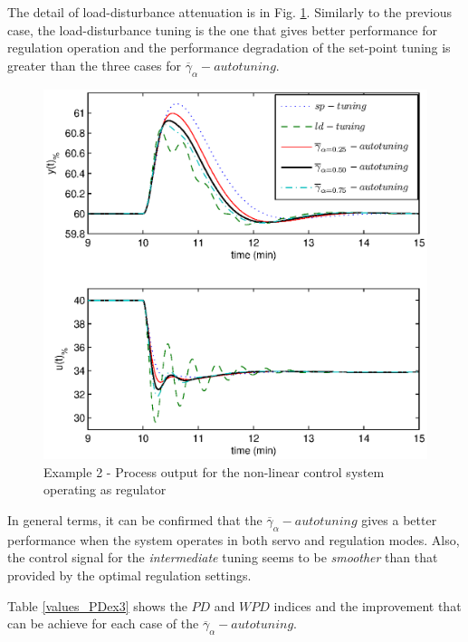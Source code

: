 The detail of load-disturbance attenuation is in Fig. \ref{y33}.
Similarly to the previous case, the load-disturbance tuning is the
one that gives better performance for regulation operation and the
performance degradation of the set-point tuning is greater than
the three cases for $\overline{\gamma}_{\alpha}-autotuning$.

\begin{figure}[htb!]
    \begin{center}
        \includegraphics[width=0.7\linewidth]{y3outp3.eps}
       \caption{Example 2 - Process output for the non-linear control system operating as regulator} \label{y33}
    \end{center}
\end{figure}

In general terms, it can be confirmed that the
$\overline{\gamma}_{\alpha}-autotuning$ gives a better performance
when the system operates in both servo and regulation modes. Also,
the control signal for the \emph{intermediate} tuning seems to be
\emph{smoother} than that provided by the optimal regulation
settings.

Table \ref{values_PDex3} shows the $\mathit{PD}$ and
$\mathit{WPD}$ indices and the improvement that can be achieve for
each case of the $\overline{\gamma}_{\alpha}-autotuning$.\\

